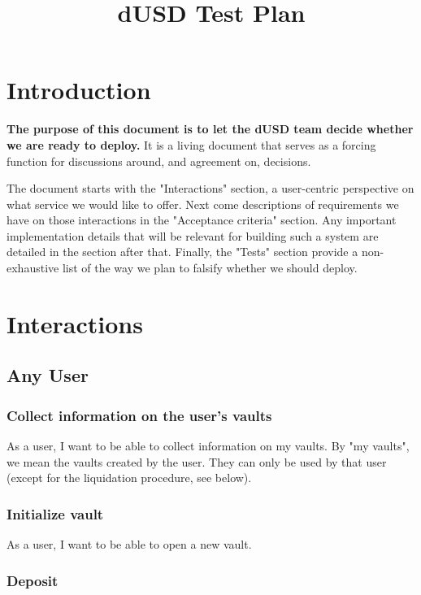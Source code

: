 \documentclass{article} %
\title{dUSD Test Plan}
\begin{document}
\maketitle

\section{Introduction}

\textbf{The purpose of this document is to let the dUSD team decide whether we are ready to deploy.}
It is a living document that serves as a forcing function for discussions around, and agreement on, decisions.

The document starts with the "Interactions" section, a user-centric perspective on what service we would like to offer.
Next come descriptions of requirements we have on those interactions in the "Acceptance criteria" section.
Any important implementation details that will be relevant for building such a system are detailed in the section after that.
Finally, the "Tests" section provide a non-exhaustive list of the way we plan to falsify whether we should deploy.

\section{Interactions}


\subsection{Any User}

\subsubsection{Collect information on the user's vaults}

As a user, I want to be able to collect information on my vaults. By "my
vaults", we mean the vaults created by the user. They can only be used by that
user (except for the liquidation procedure, see below).

\subsubsection{Initialize vault}

As a user, I want to be able to open a new vault.

\subsubsection{Deposit}
\end{document}
